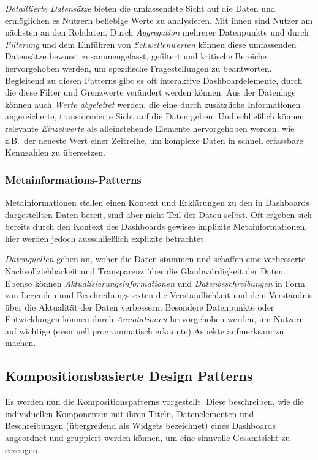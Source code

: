 \emph{Detaillierte Datensätze} bieten die umfassendste Sicht auf die Daten und ermöglichen es Nutzern beliebige Werte zu analysieren.
Mit ihnen sind Nutzer am nächsten an den Rohdaten.
Durch \emph{Aggregation} mehrerer Datenpunkte und durch \emph{Filterung} und dem Einführen von \emph{Schwellenwerten} können diese umfassenden Datensätze bewusst zusammengefasst, gefiltert und kritische Bereiche hervorgehoben werden, um spezifische Fragestellungen zu beantworten.
Begleitend zu diesen Patterns gibt es oft interaktive Dashboardelemente, durch die diese Filter und Grenzwerte verändert werden können.
Aus der Datenlage können auch \emph{Werte abgeleitet} werden, die eine durch zusätzliche Informationen angereicherte, transformierte Sicht auf die Daten geben.
Und schließlich können relevante \emph{Einzelwerte} als alleinstehende Elemente hervorgehoben werden, wie z.B.\ der neueste Wert einer Zeitreihe, um komplexe Daten in schnell erfassbare Kennzahlen zu übersetzen.

\subsubsection{Metainformations-Patterns}\label{subsubsec:meta-information-patterns}

Metainformationen stellen einen Kontext und Erklärungen zu den in Dashboards dargestellten Daten bereit, sind aber nicht Teil der Daten selbst.
Oft ergeben sich bereits durch den Kontext des Dashboards gewisse implizite Metainformationen, hier werden jedoch ausschließlich explizite betrachtet.

\emph{Datenquellen} geben an, woher die Daten stammen und schaffen eine verbesserte Nachvollziehbarkeit und Transparenz über die Glaubwürdigkeit der Daten.
Ebenso können \emph{Aktualisierungsinformationen} und \emph{Datenbeschreibungen} in Form von Legenden und Beschreibungstexten die Verständlichkeit und dem Verständnis über die Aktualität der Daten verbessern.
Besondere Datenpunkte oder Entwicklungen können durch \emph{Annotationen} hervorgehoben werden, um Nutzern auf wichtige (eventuell programmatisch erkannte) Aspekte aufmerksam zu machen.


\subsection{Kompositionsbasierte Design Patterns}\label{subsec:conposition-design-patterns}

Es werden nun die Kompositionspatterns vorgestellt.
Diese beschreiben, wie die individuellen Komponenten mit ihren Titeln, Datenelementen und Beschreibungen (übergreifend als Widgets bezeichnet) eines Dashboards angeordnet und gruppiert werden können, um eine sinnvolle Gesamtsicht zu erzeugen.

